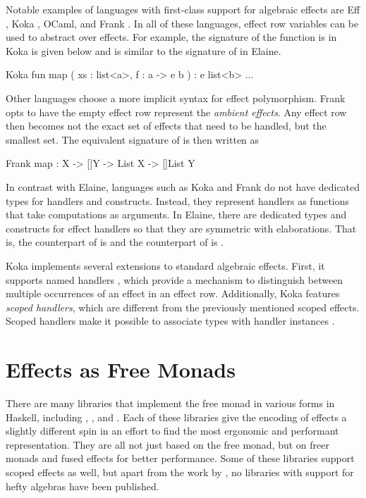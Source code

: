 Notable examples of languages with first-class support for algebraic effects are Eff \autocite{bauer_programming_2015}, Koka \autocite{leijen_koka_2014}, OCaml\citationneeded, and Frank \autocite{lindley_be_2017}. In all of these languages, effect row variables can be used to abstract over effects. For example, the signature of the  function is in Koka is given below and is similar to the signature of  in Elaine.

\begin{lst}{Koka}
fun map ( xs : list<a>, f : a -> e b ) : e list<b>
    ...
\end{lst}
%
Other languages choose a more implicit syntax for effect polymorphism. Frank \autocite{lindley_be_2017} opts to have the empty effect row represent the \emph{ambient effects}. Any effect row then becomes not the exact set of effects that need to be handled, but the smallest set. The equivalent signature of  is then written as

\begin{lst}{Frank}
map : {X -> []Y} -> List X -> []List Y
\end{lst}
%
In contrast with Elaine, languages such as Koka and Frank do not have dedicated types for handlers and  constructs. Instead, they represent handlers as functions that take computations as arguments. In Elaine, there are dedicated types and constructs for effect handlers so that they are symmetric with elaborations. That is, the counterpart of  is  and the counterpart of  is .

Koka implements several extensions to standard algebraic effects. First, it supports named handlers \autocite{xie_first-class_2022}, which provide a mechanism to distinguish between multiple occurrences of an effect in an effect row. Additionally, Koka features \emph{scoped handlers}, which are different from the previously mentioned scoped effects. Scoped handlers make it possible to associate types with handler instances \autocite{xie_first-class_2022}.

\section{Effects as Free Monads}

There are many libraries that implement the free monad in various forms in Haskell, including , ,  and . Each of these libraries give the encoding of effects a slightly different spin in an effort to find the most ergonomic and performant representation. They are all not just based on the free monad, but on freer monads \autocite{kiselyov_freer_2016} and fused effects \autocite{hinze_fusion_2015} for better performance. Some of these libraries support scoped effects as well, but apart from the work by \textcite{bach_poulsen_hefty_2023}, no libraries with support for hefty algebras have been published.

